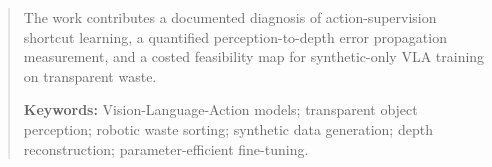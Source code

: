 \begin{abstract}
The work contributes a documented diagnosis of action-supervision shortcut learning, a quantified perception-to-depth error propagation measurement, and a costed feasibility map for synthetic-only VLA training on transparent waste.

\vspace{1em}
\noindent\textbf{Keywords:} Vision-Language-Action models; transparent object perception; robotic waste sorting; synthetic data generation; depth reconstruction; parameter-efficient fine-tuning.
\end{abstract}
